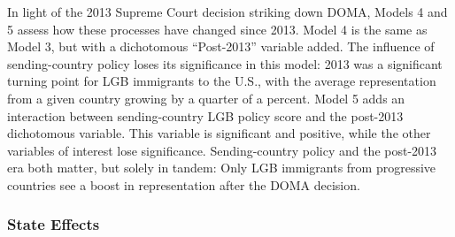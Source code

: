 \documentclass[
  11pt,
]{article}
\begin{document}
In light of the 2013 Supreme Court decision striking down DOMA, Models 4 and 5 assess how these processes have changed since 2013. Model 4 is the same as Model 3, but with a dichotomous ``Post-2013'' variable added. The influence of sending-country policy loses its significance in this model: 2013 was a significant turning point for LGB immigrants to the U.S., with the average representation from a given country growing by a quarter of a percent. Model 5 adds an interaction between sending-country LGB policy score and the post-2013 dichotomous variable. This variable is significant and positive, while the other variables of interest lose significance. Sending-country policy and the post-2013 era both matter, but solely in tandem: Only LGB immigrants from progressive countries see a boost in representation after the DOMA decision.

\hypertarget{state-effects}{%
\subsubsection{State Effects}\label{state-effects}}
\end{document}
